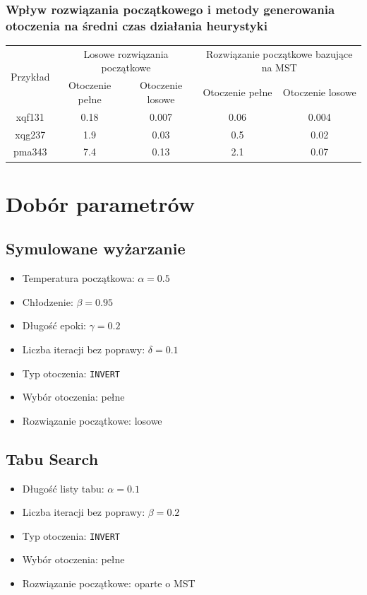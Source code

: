 \documentclass{article}
\begin{document}
\subsubsection{Wpływ rozwiązania początkowego i metody generowania otoczenia na średni czas działania heurystyki}
\begin{table}[h!]
    \centering
    \begin{tabular}{|c|c|c|c|c|}
        \hline 
        \multirow{2}{*}{Przykład} & \multicolumn{2}{|c|}{Losowe rozwiązania początkowe} & \multicolumn{2}{|c|}{Rozwiązanie początkowe bazujące na MST} \\
        \cline{2-5}
        \cline{2-5} & Otoczenie pełne & Otoczenie losowe & Otoczenie pełne & Otoczenie losowe \\
        \hline
        xqf131 & 0.18 & 0.007 & 0.06 & 0.004 \\
        \hline
        xqg237 & 1.9 & 0.03 & 0.5 & 0.02 \\
        \hline
        pma343 & 7.4 & 0.13 & 2.1 & 0.07 \\
        \hline
    \end{tabular}
\end{table}

\section{Dobór parametrów}
\subsection{Symulowane wyżarzanie}
\begin{itemize}
    \item Temperatura początkowa: $\alpha = 0.5$
    \item Chłodzenie: $\beta = 0.95$
    \item Długość epoki: $\gamma = 0.2$
    \item Liczba iteracji bez poprawy: $\delta = 0.1$
    \item Typ otoczenia: \texttt{INVERT}
    \item Wybór otoczenia: pełne
    \item Rozwiązanie początkowe: losowe
\end{itemize}

\subsection{Tabu Search}
\begin{itemize}
    \item Długość listy tabu: $\alpha = 0.1$
    \item Liczba iteracji bez poprawy: $\beta = 0.2$
    \item Typ otoczenia: \texttt{INVERT}
    \item Wybór otoczenia: pełne
    \item Rozwiązanie początkowe: oparte o MST
\end{itemize}
\end{document}
